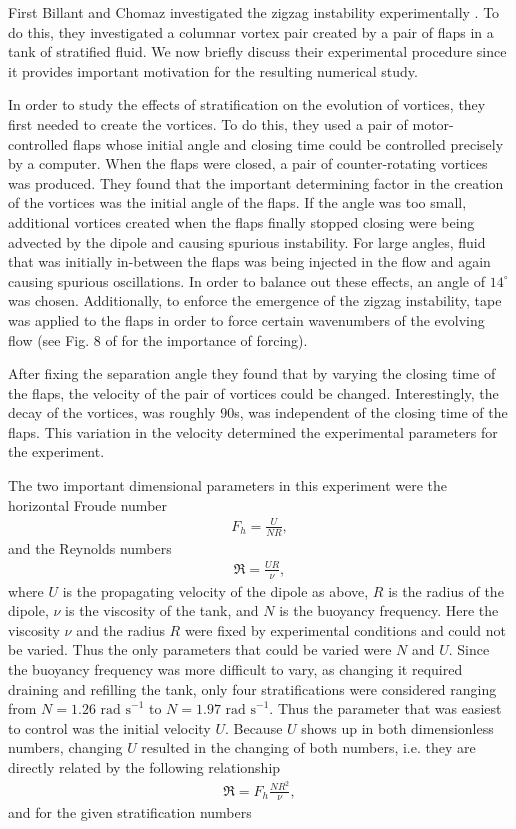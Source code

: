 First Billant and Chomaz investigated the zigzag instability experimentally \cite{bc2000a}. To do this, they investigated a columnar vortex pair created by a pair of flaps in a tank of stratified fluid. We now briefly discuss their experimental procedure since it provides important motivation for the resulting numerical study. 

In order to study the effects of stratification on the evolution of vortices, they first needed to create the vortices. To do this, they used a pair of motor-controlled flaps whose initial angle and closing time could be controlled precisely by a computer. When the flaps were closed, a pair of counter-rotating vortices was produced. They found that the important determining factor in the creation of the vortices was the initial angle of the flaps. If the angle was too small, additional vortices created when the flaps finally stopped closing were being advected by the dipole and causing spurious instability. For large angles, fluid that was initially in-between the flaps was being injected in the flow and again causing spurious oscillations. In order to balance out these effects, an angle of $14^{\circ}$ was chosen. Additionally, to enforce the emergence of the zigzag instability, tape was applied to the flaps in order to force certain wavenumbers of the evolving flow (see Fig. 8 of \cite{bc2000a} for the importance of forcing).

After fixing the separation angle they found that by varying the closing time of the flaps, the velocity of the pair of vortices could be changed. Interestingly, the decay of the vortices, was roughly $90$s, was independent of the closing time of the flaps. This variation in the velocity determined the experimental parameters for the experiment. 

The two important dimensional parameters in this experiment were the horizontal Froude number 
\begin{align}
F_{h} = \frac{U}{NR},
\end{align}
and the Reynolds numbers
\begin{align}
\Re= \frac{UR}{\nu},
\end{align}
where $U$ is the propagating velocity of the dipole as above, $R$ is the radius of the dipole, $\nu$ is the viscosity of the tank, and $N$ is the buoyancy frequency. Here the viscosity $\nu$ and the radius $R$ were fixed by experimental conditions and could not be varied. Thus the only parameters that could be varied were $N$ and $U$. Since the buoyancy frequency was more difficult to vary, as changing it required draining and refilling the tank, only four stratifications were considered ranging from $N=1.26 \text{ rad s}^{-1}$ to $N=1.97 \text { rad s}^{-1}$. Thus the parameter that was easiest to control was the initial velocity $U$. Because $U$ shows up in both dimensionless numbers, changing $U$ resulted in the changing of both numbers, i.e. they are directly related by the following relationship 
\begin{align}
\Re = F_{h}\frac{NR^{2}}{\nu},
\end{align} 
and for the given stratification numbers 

